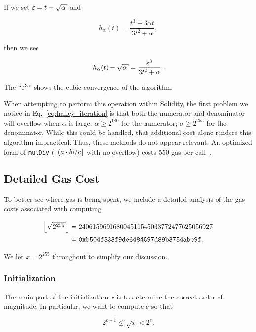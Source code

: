 \noindent
If we set $\eps = t - \sqrt{\alpha}$ and

\begin{equation}
    h_{\alpha}(t) = \frac{t^{3} + 3\alpha t}{3t^{2} + \alpha},
\end{equation}

\noindent
then we see

\begin{equation}
    h_{\alpha}(t) - \sqrt{\alpha}= \frac{\eps^{3}}{3t^{2} + \alpha}.
\end{equation}

\noindent
The ``$\varepsilon^{3}$'' shows the cubic convergence of the algorithm.

When attempting to perform this operation within Solidity,
the first problem we notice in Eq.~\eqref{eq:halley_iteration}
is that both the numerator and denominator
will overflow when $\alpha$ is large:
$\alpha \ge 2^{180}$ for the numerator; 
$\alpha \ge 2^{255}$ for the denominator.
While this could be handled,
that additional cost alone renders this algorithm impractical.
Thus, these methods do not appear relevant.
An optimized form of \texttt{mulDiv}
($\left\lfloor (a\cdot b)/c \right\rfloor$ with no overflow)
costs 550 gas per call~\cite{MathInSolidity3}.

\subsection{Detailed Gas Cost}

To better see where gas is being spent,
we include a detailed analysis of the gas costs associated
with computing

\begin{align}
    \floor{\sqrt{2^{255}}} &= 240615969168004511545033772477625056927
        \nonumber\\
    &= \texttt{0xb504f333f9de6484597d89b3754abe9f}.
\end{align}

\noindent
We let $x = 2^{255}$ throughout to simplify our discussion.

\subsubsection{Initialization}

The main part of the initialization $x$ is to determine
the correct order-of-magnitude.
In particular, we want to compute $e$ so that

\begin{equation}
    2^{e-1} \le \sqrt{x} < 2^{e}.
\end{equation}


